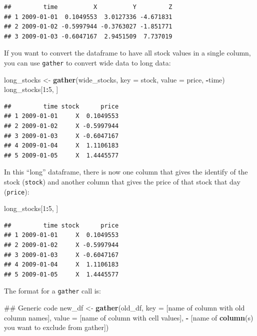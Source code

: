 \documentclass[]{book}
\makeatletter
\newenvironment{Shaded}{\begin{snugshade}}{\end{snugshade}}
\newcommand{\KeywordTok}[1]{\textcolor[rgb]{0.13,0.29,0.53}{\textbf{#1}}}
\newcommand{\DataTypeTok}[1]{\textcolor[rgb]{0.13,0.29,0.53}{#1}}
\newcommand{\DecValTok}[1]{\textcolor[rgb]{0.00,0.00,0.81}{#1}}
\newcommand{\StringTok}[1]{\textcolor[rgb]{0.31,0.60,0.02}{#1}}
\newcommand{\OperatorTok}[1]{\textcolor[rgb]{0.81,0.36,0.00}{\textbf{#1}}}
\newcommand{\NormalTok}[1]{#1}
\newenvironment{kframe}{%
\medskip{}
\setlength{\fboxsep}{.8em}
 \def\at@end@of@kframe{}%
 \ifinner\ifhmode%
  \def\at@end@of@kframe{\end{minipage}}%
  \begin{minipage}{\columnwidth}%
 \fi\fi%
 \def\FrameCommand##1{\hskip\@totalleftmargin \hskip-\fboxsep
 \colorbox{shadecolor}{##1}\hskip-\fboxsep
     \hskip-\linewidth \hskip-\@totalleftmargin \hskip\columnwidth}%
 \MakeFramed {\advance\hsize-\width
   \@totalleftmargin\z@ \linewidth\hsize
   \@setminipage}}%
 {\par\unskip\endMakeFramed%
 \at@end@of@kframe}
\renewenvironment{Shaded}{\begin{kframe}}{\end{kframe}}
\theoremstyle{definition}
\theoremstyle{definition}
\theoremstyle{definition}
\theoremstyle{remark}
\makeatother
\begin{document}
\begin{verbatim}
##         time          X          Y         Z
## 1 2009-01-01  0.1049553  3.0127336 -4.671831
## 2 2009-01-02 -0.5997944 -0.3763027 -1.851771
## 3 2009-01-03 -0.6047167  2.9451509  7.737019
\end{verbatim}

If you want to convert the dataframe to have all stock values in a
single column, you can use \texttt{gather} to convert wide data to long
data:

\begin{Shaded}
\begin{Highlighting}[]
\NormalTok{long_stocks <-}\StringTok{ }\KeywordTok{gather}\NormalTok{(wide_stocks, }\DataTypeTok{key =}\NormalTok{ stock,}
                      \DataTypeTok{value =}\NormalTok{ price, }\OperatorTok{-}\NormalTok{time)}
\NormalTok{long_stocks[}\DecValTok{1}\OperatorTok{:}\DecValTok{5}\NormalTok{, ]}
\end{Highlighting}
\end{Shaded}

\begin{verbatim}
##         time stock      price
## 1 2009-01-01     X  0.1049553
## 2 2009-01-02     X -0.5997944
## 3 2009-01-03     X -0.6047167
## 4 2009-01-04     X  1.1106183
## 5 2009-01-05     X  1.4445577
\end{verbatim}

In this ``long'' dataframe, there is now one column that gives the
identify of the stock (\texttt{stock}) and another column that gives the
price of that stock that day (\texttt{price}):

\begin{Shaded}
\begin{Highlighting}[]
\NormalTok{long_stocks[}\DecValTok{1}\OperatorTok{:}\DecValTok{5}\NormalTok{, ]}
\end{Highlighting}
\end{Shaded}

\begin{verbatim}
##         time stock      price
## 1 2009-01-01     X  0.1049553
## 2 2009-01-02     X -0.5997944
## 3 2009-01-03     X -0.6047167
## 4 2009-01-04     X  1.1106183
## 5 2009-01-05     X  1.4445577
\end{verbatim}

The format for a \texttt{gather} call is:

\begin{Shaded}
\begin{Highlighting}[]
\NormalTok{## Generic code}
\NormalTok{new_df <-}\StringTok{ }\KeywordTok{gather}\NormalTok{(old_df,}
                 \DataTypeTok{key =}\NormalTok{ [name of column with old column names],}
                 \DataTypeTok{value =}\NormalTok{ [name of column with cell values],}
                 \OperatorTok{-}\StringTok{ }\NormalTok{[name of }\KeywordTok{column}\NormalTok{(s) you want to }
\NormalTok{                    exclude from gather])}
\end{Highlighting}
\end{Shaded}
\end{document}
